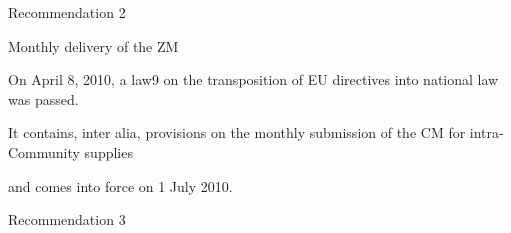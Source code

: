 \documentclass[10pt]{article}
\begin{document}
Recommendation 2



Monthly delivery of the ZM

On April 8, 2010, a law9 on the transposition of EU directives into national law was passed.


It contains, inter alia, provisions on the monthly submission of the CM for intra-Community supplies

and comes into force on 1 July 2010.


Recommendation 3
\end{document}
